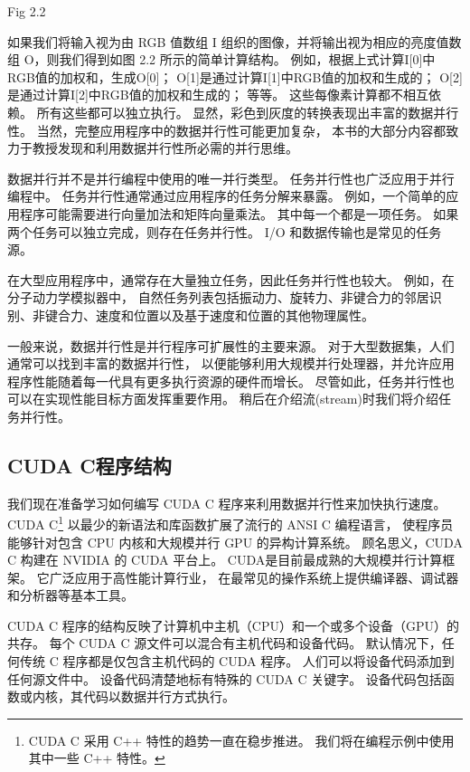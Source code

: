 {\color{red} Fig 2.2}

如果我们将输入视为由 RGB 值数组 I 组织的图像，并将输出视为相应的亮度值数组 O，则我们得到如图 2.2 所示的简单计算结构。 
例如，根据上式计算I[0]中RGB值的加权和，生成O[0]； O[1]是通过计算I[1]中RGB值的加权和生成的； 
O[2]是通过计算I[2]中RGB值的加权和生成的； 等等。 这些每像素计算都不相互依赖。 所有这些都可以独立执行。 
显然，彩色到灰度的转换表现出丰富的数据并行性。 当然，完整应用程序中的数据并行性可能更加复杂，
本书的大部分内容都致力于教授发现和利用数据并行性所必需的并行思维。

\begin{remark}[任务并行与数据并行]
数据并行并不是并行编程中使用的唯一并行类型。 任务并行性也广泛应用于并行编程中。 
任务并行性通常通过应用程序的任务分解来暴露。 例如，一个简单的应用程序可能需要进行向量加法和矩阵向量乘法。 
其中每一个都是一项任务。 如果两个任务可以独立完成，则存在任务并行性。 I/O 和数据传输也是常见的任务源。

在大型应用程序中，通常存在大量独立任务，因此任务并行性也较大。 例如，在分子动力学模拟器中，
自然任务列表包括振动力、旋转力、非键合力的邻居识别、非键合力、速度和位置以及基于速度和位置的其他物理属性。

一般来说，数据并行性是并行程序可扩展性的主要来源。 对于大型数据集，人们通常可以找到丰富的数据并行性，
以便能够利用大规模并行处理器，并允许应用程序性能随着每一代具有更多执行资源的硬件而增长。 
尽管如此，任务并行性也可以在实现性能目标方面发挥重要作用。 稍后在介绍流(stream)时我们将介绍任务并行性。
\end{remark}

\subsection{CUDA C程序结构}
我们现在准备学习如何编写 CUDA C 程序来利用数据并行性来加快执行速度。 
CUDA C\footnote{CUDA C 采用 C++ 特性的趋势一直在稳步推进。 我们将在编程示例中使用其中一些 C++ 特性。} 
以最少的新语法和库函数扩展了流行的 ANSI C 编程语言，
使程序员能够针对包含 CPU 内核和大规模并行 GPU 的异构计算系统。 顾名思义，CUDA C 构建在 NVIDIA 的 CUDA 平台上。 
CUDA是目前最成熟的大规模并行计算框架。 它广泛应用于高性能计算行业，
在最常见的操作系统上提供编译器、调试器和分析器等基本工具。

CUDA C 程序的结构反映了计算机中主机（CPU）和一个或多个设备（GPU）的共存。 
每个 CUDA C 源文件可以混合有主机代码和设备代码。 默认情况下，任何传统 C 程序都是仅包含主机代码的 CUDA 程序。 
人们可以将设备代码添加到任何源文件中。 设备代码清楚地标有特殊的 CUDA C 关键字。 
设备代码包括函数或内核，其代码以数据并行方式执行。

